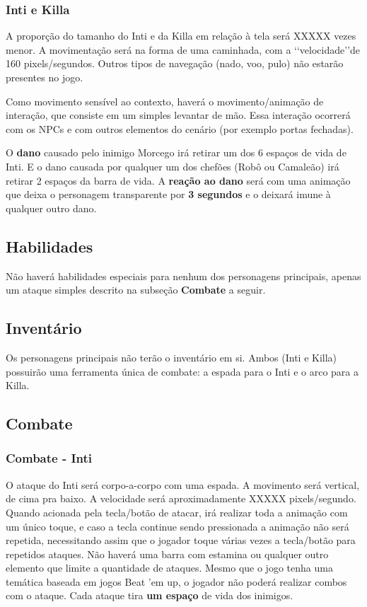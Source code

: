 \documentclass[12pt]{article}
\begin{document}
\subsubsection{Inti e Killa}
A proporção do tamanho do Inti e da Killa em relação à tela será XXXXX vezes
menor. A movimentação será na forma de uma caminhada, com a \lq\lq velocidade\rq\rq de 160
pixels/segundos. Outros tipos de navegação (nado, voo, pulo) não estarão
presentes no jogo.

Como movimento sensível ao contexto, haverá o movimento/animação de interação,
que consiste em um simples levantar de mão. Essa interação ocorrerá com os NPCs
e com outros elementos do cenário (por exemplo portas fechadas).

O {\bf dano} causado pelo inimigo Morcego irá retirar um dos 6 espaços de vida de
Inti. E o dano causada por qualquer um dos chefões (Robô ou Camaleão) irá
retirar 2 espaços da barra de vida. A {\bf reação ao dano} será com uma animação
que deixa o personagem transparente por {\bf 3 segundos} e o deixará imune à
qualquer outro dano.

\subsection{Habilidades}
Não haverá habilidades especiais para nenhum dos personagens principais, apenas
um ataque simples descrito na subseção {\bf Combate} a seguir.

\subsection{Inventário}
Os personagens principais não terão o inventário em si. Ambos (Inti e Killa)
possuirão uma ferramenta única de combate: a espada para o Inti e o arco para a
Killa.

\subsection{Combate}
\subsubsection{Combate - Inti}
O ataque do Inti será corpo-a-corpo com uma espada. A movimento será vertical,
de cima pra baixo. A velocidade será aproximadamente XXXXX pixels/segundo. Quando
acionada pela tecla/botão de atacar, irá realizar toda a animação com um único
toque, e caso a tecla continue sendo pressionada a animação  não será repetida,
necessitando assim que o jogador toque várias vezes a tecla/botão para repetidos
ataques. Não haverá uma barra com estamina ou qualquer outro elemento que limite
a quantidade de ataques. Mesmo que o jogo tenha uma temática baseada em jogos
Beat 'em up, o jogador não poderá realizar combos com o ataque. Cada ataque tira
{\bf um espaço} de vida dos inimigos.
\end{document}
